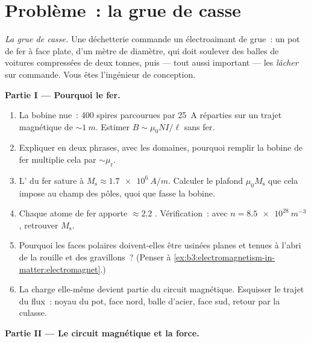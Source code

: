 \section{Problème~: la grue de casse}

\begin{problem}\label{pb:b3:electromagnetism-in-matter:1}
\emph{La grue de casse.} Une déchetterie commande un électroaimant de
grue~: un pot de fer à face plate, d'un mètre de diamètre, qui doit
soulever des balles de voitures compressées de deux tonnes, puis ---
tout aussi important --- les \emph{lâcher} sur commande. Vous êtes
l'ingénieur de conception.

\medskip\noindent\textbf{Partie I --- Pourquoi le fer.}

\begin{enumerate}
  \item La bobine nue~: 400 spires parcourues par \qty{25}{A}
        réparties sur un trajet magnétique de $\sim\qty{1}{m}$.
        Estimer $B \sim
        \mu_0NI/\ell$ sans fer.
  \item Expliquer en deux phrases, avec les domaines, pourquoi
        remplir la bobine de fer multiplie cela par
        $\sim\mu_{\text{r}}$.
  \item L' du fer sature à $M_{\text{s}} \approx
        \qty{1.7e6}{A/m}$. Calculer le plafond $\mu_0M_{\text{s}}$
        que cela impose au champ des pôles, quoi que fasse la
        bobine.
  \item Chaque atome de fer apporte $\approx 2.2$ . Vérification~: avec $n = \qty{8.5e28}{m^{-3}}$,
        retrouver $M_{\text{s}}$.
  \item Pourquoi les faces polaires doivent-elles être usinées
        planes et tenues à l'abri de la rouille et des gravillons~?
        (Penser à
        \cref{ex:b3:electromagnetism-in-matter:electromagnet}.)
  \item La charge elle-même devient partie du circuit magnétique.
        Esquisser le trajet du flux~: noyau du pot, face nord,
        balle d'acier, face sud, retour par la culasse.
\end{enumerate}

\medskip\noindent\textbf{Partie II --- Le circuit magnétique et la force.}


\end{problem}
